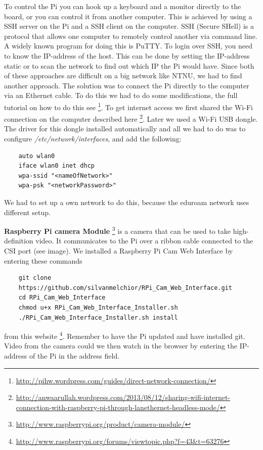To control the Pi you can hook up a keyboard and a monitor directly to the board, or you can control it from another computer. 
This is achieved by using a SSH server on the Pi and a SSH client on the computer. 
SSH (Secure SHell) is a protocol that allows one computer to remotely control another via command line. A widely known program for doing this is PuTTY. To login over SSH, you need to know the IP-address of the host. This can be done by setting the IP-address static or to scan the network to find out which IP the Pi would have. Since both of these approaches are difficult on a big network like NTNU, we had to find another approach. The solution was to connect the Pi directly to the computer via an Ethernet cable. To do this we had to do some modifications, the full tutorial on how to do this see \footnote{\url{http://pihw.wordpress.com/guides/direct-network-connection/}}. To get internet access we first shared the Wi-Fi connection on the computer described here \footnote{\url{http://anwaarullah.wordpress.com/2013/08/12/sharing-wifi-internet-connection-with-raspberry-pi-through-lanethernet-headless-mode/}}. Later we used a Wi-Fi USB dongle. The driver for this dongle installed automatically and all we had to do was to configure \textit{/etc/network/interfaces}, and add the following:
\begin{verbatim}
    auto wlan0
    iface wlan0 inet dhcp
    wpa-ssid "<nameOfNetwork>"
    wpa-psk "<networkPassword>"
\end{verbatim}
We had to set up a own network to do this, because the eduroam network uses different setup.
\bigskip

\textbf{Raspberry Pi camera Module} \footnote{\url{http://www.raspberrypi.org/product/camera-module/}}
is a camera that can be used to take high-definition video. It communicates to the Pi over a ribbon cable connected to the CSI port (see image). We installed a Raspberry Pi Cam Web Interface by entering these commands
\begin{verbatim}
    git clone
    https://github.com/silvanmelchior/RPi_Cam_Web_Interface.git
    cd RPi_Cam_Web_Interface
    chmod u+x RPi_Cam_Web_Interface_Installer.sh
    ./RPi_Cam_Web_Interface_Installer.sh install
\end{verbatim}
from this website \footnote{\url{http://www.raspberrypi.org/forums/viewtopic.php?f=43&t=63276}}.
Remember to have the Pi updated and have installed git.
Video from the camera could we then watch in the browser by entering the IP-address of the Pi in the address field.
\bigskip

